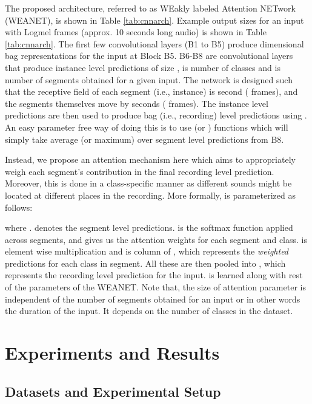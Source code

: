 \documentclass{article}
\begin{document}
The proposed architecture, referred to as WEakly labeled Attention NETwork (WEANET), is shown in Table \ref{tab:cnnarch}. 
Example output sizes for an input with  Logmel frames (approx. 10 seconds long audio) is shown in Table \ref{tab:cnnarch}. 
The first few convolutional layers (B1 to B5) produce  dimensional bag representations for the input at Block B5. 
B6-B8 are  convolutional layers that produce instance level predictions of size ,  is number of classes and  is number of segments obtained for a given input. 
The network is designed such that the receptive field of each segment (i.e., instance) is  second ( frames), and the segments themselves move by  seconds ( frames). 
The instance level predictions are then used to produce bag (i.e., recording) level predictions using . 
An easy parameter free way of doing this is to use  (or ) functions which will simply take average (or maximum) over segment level predictions from B8. 

Instead, we propose an attention mechanism here which aims to appropriately weigh each segment's contribution in the final recording level prediction. 
Moreover, this is done in a class-specific manner as different sounds might be located at different places in the recording. 
More formally,  is parameterized as follows: 

where .  denotes the segment level predictions. 
 is the softmax function applied across segments, 
and  gives us the attention weights for each segment and class.
 is element wise multiplication and  is  column of , 
which represents the {\it weighted} predictions for each class in  segment. 
All these are then pooled into , which represents the recording level prediction for the input.  
 is learned along with rest of the parameters of the WEANET. Note that, the size of attention parameter  is independent of the number of segments obtained for an input or in other words the duration of the input. It depends on the number of classes in the dataset. 



\section{Experiments and Results} \label{sec:expt}

\subsection{Datasets and Experimental Setup}
\end{document}
